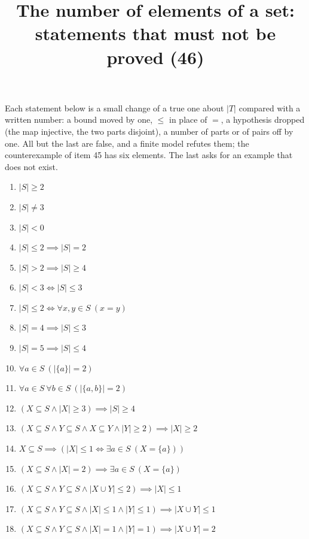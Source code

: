 \documentclass[11pt,a4paper]{article}
\title{The number of elements of a set: statements that must not be proved (46)}
\author{}
\date{}
\begin{document}
\maketitle
Each statement below is a small change of a true one about $|T|$ compared with a written number: a bound moved by one, $\le$ in place of $=$, a hypothesis dropped (the map injective, the two parts disjoint), a number of parts or of pairs off by one. All but the last are false, and a finite model refutes them; the counterexample of item 45 has six elements. The last asks for an example that does not exist.

\begin{enumerate}
\item $\displaystyle |S| \ge 2$
\item $\displaystyle |S| \neq 3$
\item $\displaystyle |S| < 0$
\item $\displaystyle |S| \le 2 \implies |S| = 2$
\item $\displaystyle |S| > 2 \implies |S| \ge 4$
\item $\displaystyle |S| < 3 \iff |S| \le 3$
\item $\displaystyle |S| \le 2 \iff \forall x, y \in S\ (x = y)$
\item $\displaystyle |S| = 4 \implies |S| \le 3$
\item $\displaystyle |S| = 5 \implies |S| \le 4$
\item $\displaystyle \forall a \in S\ (|\{a\}| = 2)$
\item $\displaystyle \forall a \in S\ \forall b \in S\ (|\{a, b\}| = 2)$
\item $\displaystyle (X \subseteq S \land |X| \ge 3) \implies |S| \ge 4$
\item $\displaystyle (X \subseteq S \land Y \subseteq S \land X \subseteq Y \land |Y| \ge 2) \implies |X| \ge 2$
\item $\displaystyle X \subseteq S \implies (|X| \le 1 \iff \exists a \in S\ (X = \{a\}))$
\item $\displaystyle (X \subseteq S \land |X| = 2) \implies \exists a \in S\ (X = \{a\})$
\item $\displaystyle (X \subseteq S \land Y \subseteq S \land |X \cup Y| \le 2) \implies |X| \le 1$
\item $\displaystyle (X \subseteq S \land Y \subseteq S \land |X| \le 1 \land |Y| \le 1) \implies |X \cup Y| \le 1$
\item $\displaystyle (X \subseteq S \land Y \subseteq S \land |X| = 1 \land |Y| = 1) \implies |X \cup Y| = 2$

\end{enumerate}
\end{document}
